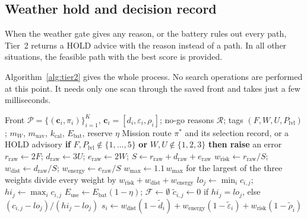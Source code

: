 \subsection{Weather hold and decision record}

When the weather gate gives any reason, or the battery rules out every path, Tier~2 returns a HOLD advice with the reason instead of a path. In all other situations, the
feasible path with the best score is provided.

Algorithm~\ref{alg:tier2} gives the whole process. No search operations are performed at
this point. It needs only one scan through the saved front and takes just a few milliseconds.

\begin{algorithm}[p]
\caption{Payload-aware route selection on the stored front (Tier~2)}\label{alg:tier2}
\begin{algorithmic}[1]
\Require Front $\mathcal{P}=\{(\mathbf{c}_i,\pi_i)\}_{i=1}^{K}$, $\mathbf{c}_i=[d_i,\varepsilon_i,\rho_i]$; no-go reasons $\mathcal{R}$; tags $(F,W,U,P_\mathrm{lvl})$; $m_W$, $m_\mathrm{uav}$, $k_\mathrm{cal}$, $E_\mathrm{bat}$, reserve $\eta$
\Ensure Mission route $\pi^*$ and its selection record, or a HOLD advisory
\State \textbf{if} $F, P_\mathrm{lvl} \notin \{1,\ldots,5\}$ \textbf{or} $W, U \notin \{1,2,3\}$ \textbf{then raise} an error 
\State $r_\mathrm{raw} \gets 2F$; \quad $d_\mathrm{raw} \gets 3U$; \quad $e_\mathrm{raw} \gets 2W$; \quad $S \gets r_\mathrm{raw}+d_\mathrm{raw}+e_\mathrm{raw}$
\State $w_\mathrm{risk} \gets r_\mathrm{raw}/S$; \quad $w_\mathrm{dist} \gets d_\mathrm{raw}/S$; \quad $w_\mathrm{energy} \gets e_\mathrm{raw}/S$
 
  \State $w_\mathrm{max} \gets 1.1\,w_\mathrm{max}$ for the largest of the three weights
  \State divide every weight by $w_\mathrm{risk}+w_\mathrm{dist}+w_\mathrm{energy}$
\EndIf
{} 
  \State $\mathit{lo}_j \gets \min_i c_{i,j}$; \quad $\mathit{hi}_j \gets \max_i c_{i,j}$
\EndFor
\State $E_\mathrm{use} \gets E_\mathrm{bat}(1-\eta)$; \quad $\mathcal{F} \gets \emptyset$
   
    \State $\tilde{c}_{i,j} \gets 0$ if $\mathit{hi}_j = \mathit{lo}_j$, else $(c_{i,j}-\mathit{lo}_j)/(\mathit{hi}_j-\mathit{lo}_j)$
  \EndFor
  \State $s_i \gets w_\mathrm{dist}(1-\tilde{d}_i) + w_\mathrm{energy}(1-\tilde{\varepsilon}_i) + w_\mathrm{risk}(1-\tilde{\rho}_i)$

\end{algorithmic}
\end{algorithm}
